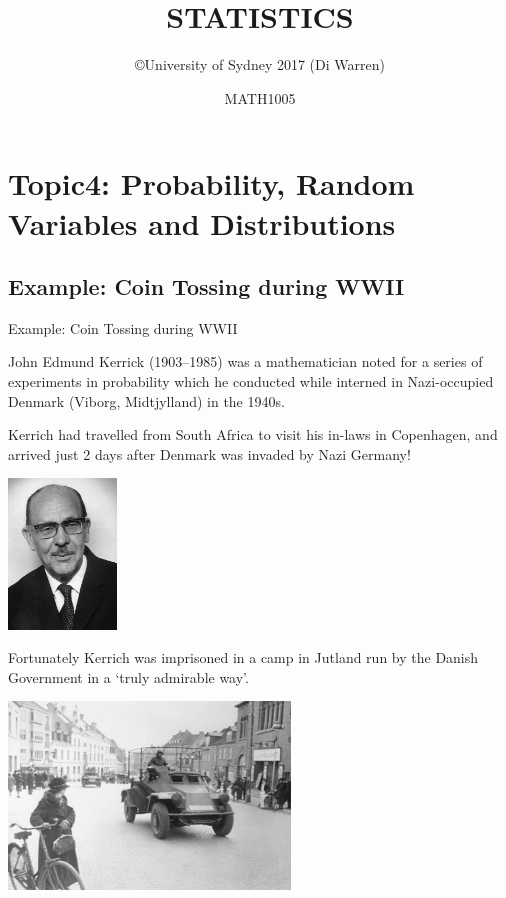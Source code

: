 \documentclass[t,xcolor=pdftex,dvipsnames,table]{beamer}
\title{\Huge STATISTICS}
\subtitle{}
\author{\copyright University of Sydney 2017 (Di Warren)}
\date{MATH1005}
\begin{document}
\section[4]{Topic4: Probability, Random Variables and Distributions}

\subsection[]{Example: Coin Tossing during WWII}
\begin{frame}{Example: Coin Tossing during WWII}

John Edmund Kerrick (1903–1985) was a mathematician noted for a series of experiments in probability which he conducted while interned in Nazi-occupied Denmark (Viborg, Midtjylland) in the 1940s.  

\vspace{.5cm}
Kerrich had travelled from South Africa to visit his in-laws in Copenhagen, and arrived just 2 days after Denmark was invaded by Nazi Germany!

\begin{center}
\includegraphics[height=4cm]{../images/KerrichBig.jpg}
\end{center}
\end{frame}

\begin{frame}{}

Fortunately Kerrich was imprisoned in a camp in Jutland run by the Danish Government in a `truly admirable way'. \\

\begin{center}
\includegraphics[height=5cm]{../images/Jutland.jpg}
\end{center}
\end{frame}
\end{document}
